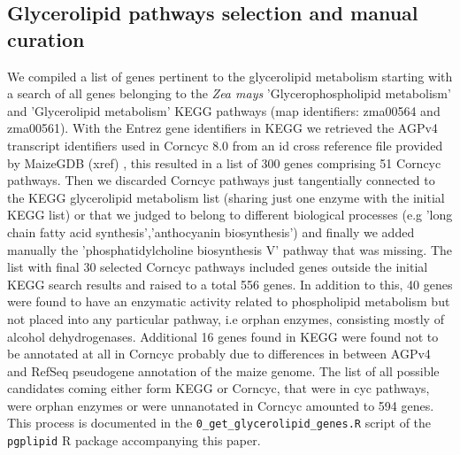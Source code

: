 \documentclass[9pt,twocolumn,twoside,lineno]{gsajnl}
\begin{document}
\subsection{Glycerolipid pathways selection and manual curation}
We compiled a list of genes pertinent to the glycerolipid metabolism starting with a search of all genes belonging to the \textit{Zea mays} 'Glycerophospholipid metabolism' and 'Glycerolipid metabolism' KEGG pathways \cite{kanehisa2019} (map identifiers: zma00564 and zma00561). With the Entrez gene identifiers in KEGG we retrieved the AGPv4 transcript identifiers used in Corncyc 8.0 \cite{portwood2019, walsh2016} from an id cross reference file provided by MaizeGDB (xref) \cite{portwood2019}, this resulted in a list of 300 genes comprising 51 Corncyc pathways. Then we discarded Corncyc pathways just tangentially connected to the KEGG glycerolipid metabolism list (sharing just one enzyme with the initial KEGG list) or that we judged to belong to different biological processes (e.g 'long chain fatty acid synthesis','anthocyanin biosynthesis') and finally we added manually the 'phosphatidylcholine biosynthesis V' pathway that was missing. The list with final 30 selected Corncyc pathways included genes outside the initial KEGG search results and raised to a total 556 genes. In addition to this, 40 genes were found to have an enzymatic activity related to phospholipid metabolism but not placed into any particular pathway, i.e orphan enzymes, consisting mostly of alcohol dehydrogenases. Additional 16 genes found in KEGG were found not to be annotated at all in Corncyc probably due to differences in between AGPv4 and RefSeq pseudogene annotation of the maize genome. The list of all possible candidates coming either form KEGG or Corncyc, that were in cyc pathways, were orphan enzymes or were unnanotated in Corncyc amounted to 594 genes. This process is documented in the \verb|0_get_glycerolipid_genes.R| script of the \verb|pgplipid| R package accompanying this paper.
\end{document}
